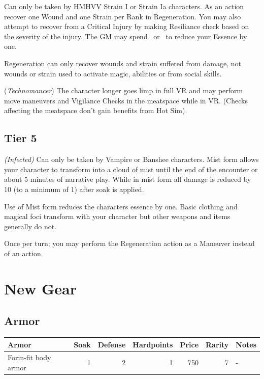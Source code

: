 \documentclass{book}
\begin{document}
\begin{multicols}{2}
 \label{regenerationtalet} Can only be taken by HMHVV Strain I or Strain Ia characters. As an action recover one Wound and one Strain per Rank in Regeneration. You may also attempt to recover from a Critical Injury by making Resiliance check based on the severity of the injury. The GM may spend \Threat \Threat \Threat\ or \Despair\ to reduce your Essence by one.

Regeneration can only recover wounds and strain suffered from damage, not wounds or strain used to activate magic, abilities or from social skills.

 (\textit{Technomancer}) The character longer goes limp in full VR and may perform move maneuvers and Vigilance Checks in the meatspace while in VR. (Checks affecting the meatspace don't gain benefits from Hot Sim). 

\section{Tier 5}
 \textit{(Infected)} Can only be taken by Vampire or Banshee characters. Mist form allows your character to transform into a cloud of mist until the end of the encounter or about 5 minutes of narrative play. While in mist form all damage is reduced by 10 (to a minimum of 1) after soak is applied. 

Use of Mist form reduces the characters essence by one. Basic clothing and magical foci transform with your character but other weapons and items generally do not.

  
Once per turn; you may perform the Regeneration action as a Maneuver instead of an action.

\end{multicols}

\chapter{New Gear}

\section{Armor}
\label{armor}
\RowColors
\begin{tabular}{ l r r r r r l }
	\rowcolor{tablegold}
	\color{white}\textbf{Armor} & Soak & Defense & Hardpoints & Price & Rarity & Notes\\
	\hline
	Form-fit body armor & 1 & 2 & 1 & 750 & 7 & -\\
\end{tabular}
\end{document}
